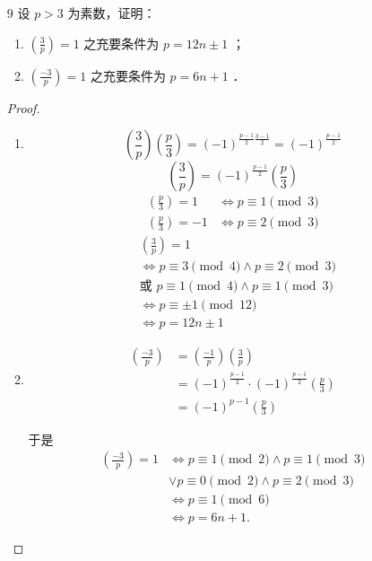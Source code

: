 \begin{enumerate}
    \item[9] 设 $p>3$ 为素数，证明：
    \begin{enumerate}
        \item $\left(\frac{3}{p}\right)=1$ 之充要条件为 $p=12 n \pm 1$ ；
        \item $\left(\frac{-3}{p}\right)=1$ 之充要条件为 $p=6 n+1$ ．
    \end{enumerate}

\begin{proof}
    \begin{enumerate}
        \item \[\left(\frac{3}{p}\right) \left(\frac{p}{3}\right) = (-1)^{\frac{p-1}{2} \frac{3-1}{2}} = (-1)^{\frac{p-1}{2}}\]
        \[ \left(\frac{3}{p}\right) = (-1)^{\frac{p-1}{2}} \left(\frac{p}{3}\right) \]
        \begin{align*}
            \left(\frac{p}{3}\right)=1 &\iff p \equiv 1 \pmod 3 \\
            \left(\frac{p}{3}\right)=-1 &\iff p \equiv 2 \pmod 3
        \end{align*}
        \begin{align*}
            &\left(\frac{3}{p}\right)=1 \\
            &\iff p \equiv 3 \pmod 4 \land p \equiv 2 \pmod 3 \\
            &\text{或 } p \equiv 1 \pmod 4 \land p \equiv 1 \pmod 3 \\
            &\iff p \equiv \pm 1 \pmod{12} \\
            &\iff p = 12n \pm 1
        \end{align*}
        \item 
        \begin{align*}
        \left(\frac{-3}{p}\right) &= \left(\frac{-1}{p}\right)\left(\frac{3}{p}\right)\\
        &= (-1)^{\frac{p-1}{2}} \cdot (-1)^{\frac{p-1}{2}}\left(\frac{p}{3}\right)\\
        &= (-1)^{p-1} \left(\frac{p}{3}\right)
        \end{align*}

        于是
        \begin{align*}
            \left(\frac{-3}{p}\right) = 1 &\Leftrightarrow p \equiv 1 \pmod{2} \land p \equiv 1 \pmod{3} \\
            &\lor p \equiv 0 \pmod{2} \land p \equiv 2 \pmod{3} \\
            &\Leftrightarrow p \equiv 1 \pmod{6} \\
            &\Leftrightarrow p = 6n+1.
        \end{align*}
    \end{enumerate}
\end{proof}


\end{enumerate}
